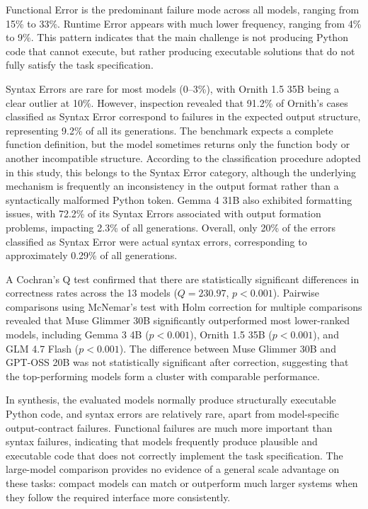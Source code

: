 Functional Error is the predominant failure mode across all models, ranging from 15\% to 33\%. Runtime Error appears with much lower frequency, ranging from 4\% to 9\%. This pattern indicates that the main challenge is not producing Python code that cannot execute, but rather producing executable solutions that do not fully satisfy the task specification.

Syntax Errors are rare for most models (0--3\%), with Ornith 1.5 35B being a clear outlier at 10\%. However, inspection revealed that 91.2\% of Ornith's cases classified as Syntax Error correspond to failures in the expected output structure, representing 9.2\% of all its generations. The benchmark expects a complete function definition, but the model sometimes returns only the function body or another incompatible structure. According to the classification procedure adopted in this study, this belongs to the Syntax Error category, although the underlying mechanism is frequently an inconsistency in the output format rather than a syntactically malformed Python token. Gemma 4 31B also exhibited formatting issues, with 72.2\% of its Syntax Errors associated with output formation problems, impacting 2.3\% of all generations. Overall, only 20\% of the errors classified as Syntax Error were actual syntax errors, corresponding to approximately 0.29\% of all generations.

A Cochran's Q test confirmed that there are statistically significant differences in correctness rates across the 13 models ($Q = 230.97$, $p < 0.001$). Pairwise comparisons using McNemar's test with Holm correction for multiple comparisons revealed that Muse Glimmer 30B significantly outperformed most lower-ranked models, including Gemma 3 4B ($p < 0.001$), Ornith 1.5 35B ($p < 0.001$), and GLM 4.7 Flash ($p < 0.001$). The difference between Muse Glimmer 30B and GPT-OSS 20B was not statistically significant after correction, suggesting that the top-performing models form a cluster with comparable performance.

In synthesis, the evaluated models normally produce structurally executable Python code, and syntax errors are relatively rare, apart from model-specific output-contract failures. Functional failures are much more important than syntax failures, indicating that models frequently produce plausible and executable code that does not correctly implement the task specification. The large-model comparison provides no evidence of a general scale advantage on these tasks: compact models can match or outperform much larger systems when they follow the required interface more consistently.
